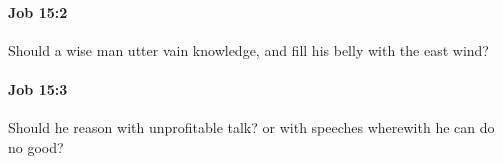 		\paragraph{Job 15:2} %
			\label{JOB-15-2}

			Should a wise man utter vain knowledge, and fill his belly with the east wind?


		\paragraph{Job 15:3} %
			\label{JOB-15-3}

			Should he reason with unprofitable talk? or with speeches wherewith he can do no good?


